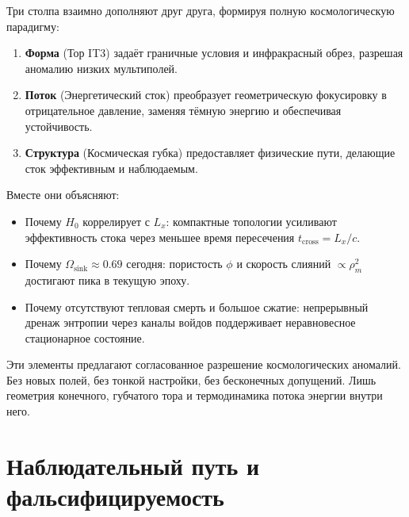 \documentclass[12pt,a4paper]{article}
\begin{document}
Три столпа взаимно дополняют друг друга, формируя полную космологическую парадигму:
\begin{enumerate}
    \item \textbf{Форма} (Тор IT3) задаёт граничные условия и инфракрасный обрез, разрешая аномалию низких мультиполей.
    \item \textbf{Поток} (Энергетический сток) преобразует геометрическую фокусировку в отрицательное давление, заменяя тёмную энергию и обеспечивая устойчивость.
    \item \textbf{Структура} (Космическая губка) предоставляет физические пути, делающие сток эффективным и наблюдаемым.
\end{enumerate}
Вместе они объясняют:
\begin{itemize}
    \item Почему $H_0$ коррелирует с $L_x$: компактные топологии усиливают эффективность стока через меньшее время пересечения $t_{\text{cross}} = L_x/c$.
    \item Почему $\Omega_{\text{sink}} \approx 0.69$ сегодня: пористость $\phi$ и скорость слияний $\propto \rho_m^2$ достигают пика в текущую эпоху.
    \item Почему отсутствуют тепловая смерть и большое сжатие: непрерывный дренаж энтропии через каналы войдов поддерживает неравновесное стационарное состояние.
\end{itemize}
Эти элементы предлагают согласованное разрешение космологических аномалий. Без новых полей, без тонкой настройки, без бесконечных допущений. Лишь геометрия конечного, губчатого тора и термодинамика потока энергии внутри него.

\section{Наблюдательный путь и фальсифицируемость}
\end{document}
